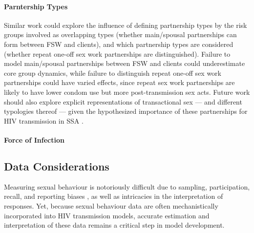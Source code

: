 \paragraph{Parntership Types}
Similar work could explore the influence of defining partnership types
by the risk groups involved \vs as overlapping types
(\eg whether main/spousal partnerships can form between FSW and clients),
and which partnership types are considered
(\eg whether repeat \vs one-off sex work partnerships are distinguished).
Failure to model main/spousal partnerships between FSW and clients
could underestimate core group dynamics, while
failure to distinguish repeat \vs one-off sex work partnerships could have varied effects,
since repeat sex work partnerships are likely to have
lower condom use but more post-transmission sex acts.
Future work should also explore explicit representations of transactional sex
--- and different typologies thereof \cite{Fielding-Miller2016} ---
given the hypothesized importance of these partnerships
for HIV transmission in SSA \cite{Wamoyi2016}.
\paragraph{Force of Infection}
\subsection{Data Considerations}\label{conc.future.data}
Measuring sexual behaviour is notoriously difficult due to
sampling, participation, recall, and reporting biases \cite{Fenton2001},
as well as intricacies in the interpretation of responses.
Yet, because sexual behaviour data are often
mechanistically incorporated into HIV transmission models,
accurate estimation and interpretation of these data remains a critical step in model development.
